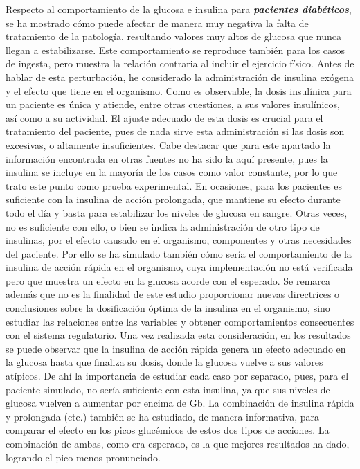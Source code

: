 Respecto al comportamiento de la glucosa e insulina para \textit{\textbf{pacientes diabéticos}}, se ha mostrado cómo puede afectar de manera muy negativa la falta de tratamiento de la patología, resultando valores muy altos de glucosa que nunca llegan a estabilizarse. Este comportamiento se reproduce también para los casos de ingesta, pero muestra la relación contraria al incluir el ejercicio físico. Antes de hablar de esta perturbación, he considerado la administración de insulina exógena y el efecto que tiene en el organismo. Como es observable, la dosis insulínica para un paciente es única y atiende, entre otras cuestiones, a sus valores insulínicos, así como a su actividad. El ajuste adecuado de esta dosis es crucial para el tratamiento del paciente, pues de nada sirve esta administración si las dosis son excesivas, o altamente insuficientes. Cabe destacar que para este apartado la información encontrada en otras fuentes no ha sido la aquí presente, pues la insulina se incluye en la mayoría de los casos como valor constante, por lo que trato este punto como prueba experimental. En ocasiones, para los pacientes es suficiente con la insulina de acción prolongada, que mantiene su efecto durante todo el día y basta para estabilizar los niveles de glucosa en sangre. Otras veces, no es suficiente con ello, o bien se indica la administración de otro tipo de insulinas, por el efecto causado en el organismo, componentes y otras necesidades del paciente. Por ello se ha simulado también cómo sería el comportamiento de la insulina de acción rápida en el organismo, cuya implementación no está verificada pero que muestra un efecto en la glucosa acorde con el esperado. Se remarca además que no es la finalidad de este estudio proporcionar nuevas directrices o conclusiones sobre la dosificación óptima de la insulina en el organismo, sino estudiar las relaciones entre las variables y obtener comportamientos consecuentes con el sistema regulatorio. Una vez realizada esta consideración, en los resultados se puede observar que la insulina de acción rápida genera un efecto adecuado en la glucosa hasta que finaliza su dosis, donde la glucosa vuelve a sus valores atípicos. De ahí la importancia de estudiar cada caso por separado, pues, para el paciente simulado, no sería suficiente con esta insulina, ya que sus niveles de glucosa vuelven a aumentar por encima de Gb. La combinación de insulina rápida y prolongada (cte.) también se ha estudiado, de manera informativa, para comparar el efecto en los picos glucémicos de estos dos tipos de acciones. La combinación de ambas, como era esperado, es la que mejores resultados ha dado, logrando el pico menos pronunciado.
